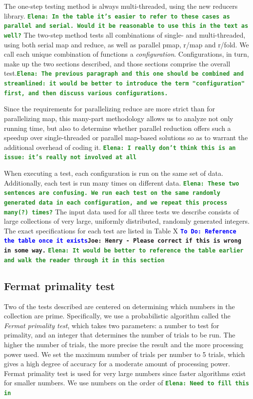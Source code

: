 \documentclass[12pt]{article}
\newcommand{\comment}[1]{{\bf \tt  {#1}}}
\newcommand{\emcomment}[1]{\textcolor{ForestGreen}{\comment{Elena: {#1}}}}
\newcommand{\joecomment}[1]{\textcolor{JoesGold}{\comment{Joe: {#1}}}}
\newcommand{\todo}[1]{\textcolor{blue}{\comment{To Do: {#1}}}}
\begin{document}
The one-step testing method is always multi-threaded, using the new reducers library. \emcomment{In the table it's easier to refer to these cases as parallel and serial. Would it be reasonable to use this in the text as well?} The two-step method tests all combinations of single- and multi-threaded, using both serial map and reduce, as well as parallel pmap, r/map and r/fold. We call each unique combination of functions a \emph{configuration}. Configurations, in turn, make up the two sections described, and those sections comprise the overall test.\emcomment{The previous paragraph and this one should be combined and streamlined: it would be better to introduce the term "configuration" first, and then discuss various configurations.}

Since the requirements for parallelizing reduce are more strict than for parallelizing map, this many-part methodology allows us to analyze not only running time, but also to determine whether parallel reduction offers such a speedup over single-threaded or parallel map-based solutions so as to warrant the additional overhead of coding it. \emcomment{I really don't think this is an issue: it's really not involved at all}

When executing a test, each configuration is run on the same set of data. Additionally, each test is run many times on different data.
\emcomment{These two sentences are confusing. We run each test on the same randomly generated data in each configuration, and we repeat this process many(?) times?} 
The input data used for all three tests we describe consists of large collections of very large, uniformly distributed, randomly generated integers. The exact specifications for each test are listed in Table X \todo{Reference the table once it exists}\joecomment{Henry - Please correct if this is wrong in some way.}
\emcomment{It would be better to reference the table earlier and walk the reader through it in this section}

\subsection{Fermat primality test}\label{sec:fermat}
Two of the tests described are centered on determining which numbers in the collection are prime. Specifically, we use a probabilistic algorithm called the \emph{Fermat primality test}, which takes two parameters: a number to test for primality, and an integer that determines the number of trials to be run. The higher the number of trials, the more precise the result and the more processing power used. We set the maximum number of trials per number to 5 trials, which gives a high degree of accuracy for a moderate amount of processing power. Fermat primality test is used for very large numbers since faster algorithms exist for smaller numbers. We use numbers on the order of \emcomment{Need to fill this in}
\end{document}
